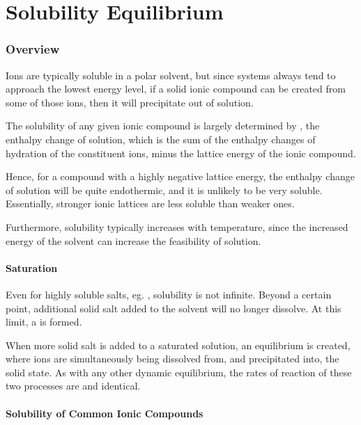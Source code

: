 
\pagebreak
\part{Solubility Equilibrium}

	\section{Overview}

		Ions are typically soluble in a polar solvent, but since systems always tend to approach the lowest energy level, if a solid ionic
		compound can be created from some of those ions, then it will precipitate out of solution.

		The solubility of any given ionic compound is largely determined by , the enthalpy change of solution, which is the sum
		of the enthalpy changes of hydration of the constituent ions, minus the lattice energy of the ionic compound.

		Hence, for a compound with a highly negative lattice energy, the enthalpy change of solution will be quite endothermic, and it is
		unlikely to be very soluble. Essentially, stronger ionic lattices are less soluble than weaker ones.

		Furthermore, solubility typically increases with temperature, since the increased energy of the solvent can increase the feasibility of
		solution.

		\subsection{Saturation}

			Even for highly soluble salts, eg. , solubility is not infinite. Beyond a certain point, additional solid salt added
			to the solvent will no longer dissolve. At this limit, a  is formed.

			When more solid salt is added to a saturated solution, an equilibrium is created, where ions are simultaneously being dissolved from,
			and precipitated into, the solid state. As with any other dynamic equilibrium, the rates of reaction of these two processes are
			 and identical.



		\pagebreak
		\subsection{Solubility of Common Ionic Compounds}

